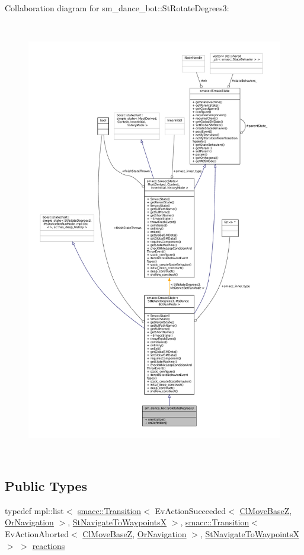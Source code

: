Collaboration diagram for sm\+\_\+dance\+\_\+bot\+:\+:St\+Rotate\+Degrees3\+:
\nopagebreak
\begin{figure}[H]
\begin{center}
\leavevmode
\includegraphics[height=550pt]{structsm__dance__bot_1_1StRotateDegrees3__coll__graph}
\end{center}
\end{figure}
\subsection*{Public Types}
\begin{DoxyCompactItemize}
\item 
typedef mpl\+::list$<$ \hyperlink{classsmacc_1_1Transition}{smacc\+::\+Transition}$<$ Ev\+Action\+Succeeded$<$ \hyperlink{classmove__base__z__client_1_1ClMoveBaseZ}{Cl\+Move\+BaseZ}, \hyperlink{classsm__dance__bot_1_1OrNavigation}{Or\+Navigation} $>$, \hyperlink{structsm__dance__bot_1_1StNavigateToWaypointsX}{St\+Navigate\+To\+WaypointsX} $>$, \hyperlink{classsmacc_1_1Transition}{smacc\+::\+Transition}$<$ Ev\+Action\+Aborted$<$ \hyperlink{classmove__base__z__client_1_1ClMoveBaseZ}{Cl\+Move\+BaseZ}, \hyperlink{classsm__dance__bot_1_1OrNavigation}{Or\+Navigation} $>$, \hyperlink{structsm__dance__bot_1_1StNavigateToWaypointsX}{St\+Navigate\+To\+WaypointsX} $>$ $>$ \hyperlink{structsm__dance__bot_1_1StRotateDegrees3_a56ce552cd6cff4127d52d0972902c590}{reactions}
\end{DoxyCompactItemize}
